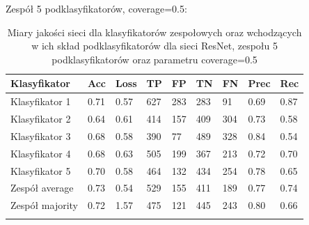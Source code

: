 \documentclass[polish,12pt]{aghthesis}
\begin{document}
\noindent Zespół 5 podklasyfikatorów, coverage=0.5:
\renewcommand{\arraystretch}{1.75}
 \begin{longtable}[h!]{|m{2.6cm}|m{1.2cm}|m{1.2cm}|m{1.2cm}|m{1.2cm}|m{1.2cm}|m{1.2cm}|m{1.2cm}|m{1.2cm}|}
 \hline
 Klasyfikator & Acc & Loss & TP & FP & TN & FN & Prec & Rec\\
 \hline
 Klasyfikator 1 & 0.71 & 0.57 & 627 & 283 & 283 & 91 & 0.69 & 0.87\\
 \hline
 Klasyfikator 2 & 0.64 & 0.61 & 414 & 157 & 409 & 304 & 0.73 & 0.58\\
 \hline
 Klasyfikator 3 & 0.68 & 0.58 & 390 & 77 & 489 & 328 & 0.84 & 0.54\\
 \hline
 Klasyfikator 4 & 0.68 & 0.63 & 505 & 199 & 367 & 213 & 0.72 & 0.70\\
 \hline
 Klasyfikator 5 & 0.70 & 0.58 & 464 & 132 & 434 & 254 & 0.78 & 0.65\\
 \hline
 Zespół average & 0.73 & 0.54 & 529 & 155 & 411 & 189 & 0.77 & 0.74\\ 
 \hline
 Zespół \newline majority & 0.72 & 1.57 & 475 & 121 & 445 & 243 & 0.80 & 0.66\\
 \hline
\caption{Miary jakości sieci dla klasyfikatorów zespołowych oraz wchodzących w ich skład podklasyfikatorów dla sieci ResNet, zespołu 5 podklasyfikatorów oraz parametru coverage=0.5}
\label{table:21}
\end{longtable}
\end{document}

